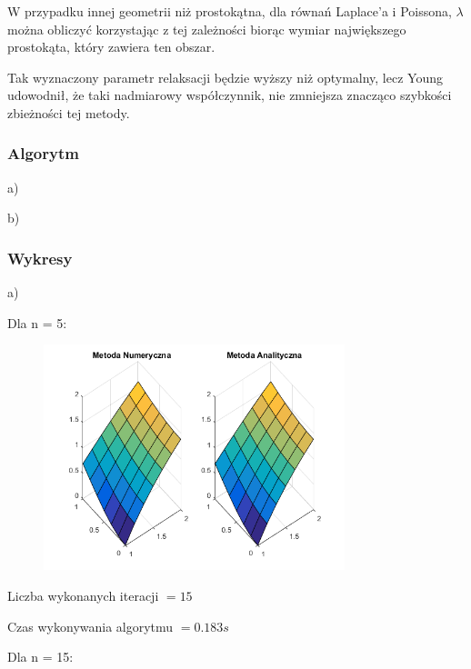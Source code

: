 W przypadku innej geometrii niż prostokątna, dla równań Laplace'a i Poissona, $\lambda$ można obliczyć korzystając z tej zależności biorąc wymiar największego prostokąta, który zawiera ten obszar.

Tak wyznaczony parametr relaksacji będzie wyższy niż optymalny, lecz Young udowodnił, że taki nadmiarowy współczynnik, nie zmniejsza znacząco szybkości zbieżności tej metody.
\newpage
\subsubsection{Algorytm}

a)


\newpage
b)


\newpage
\subsubsection{Wykresy}

a)

Dla n = 5:

\begin{figure}[!ht]
	\begin{center}
		\includegraphics[width=0.78\textwidth]{Lab6/charts/young/zad1/5.png}
	\end{center}
\end{figure}

Liczba wykonanych iteracji $ = 15 $

Czas wykonywania algorytmu $ = 0.183 s$

Dla n = 15:

